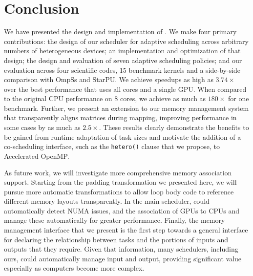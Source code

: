 \section{Conclusion}
\label{sec:conclusion}

We have presented the design and implementation of \tsarlong.  We make four
primary contributions: the design of our scheduler for adaptive scheduling
across arbitrary numbers of heterogeneous devices; an implementation and
optimization of that design; the design and evaluation of seven adaptive
scheduling policies; and our evaluation across four scientific codes, 15
benchmark kernels and a side-by-side comparison with OmpSs and StarPU. We
achieve speedups as high as $3.74 \times$ over the best performance that uses
all cores and a single GPU.  When compared to the original CPU performance on
8 cores, we achieve as much as $180 \times$ for one benchmark. Further, we
present an extension to our memory management system that transparently aligns
matrices during mapping, improving performance in some cases by as much as
$2.5\times$.  These results clearly demonstrate the benefits to be gained from
runtime adaptation of task sizes and motivate the addition of a co-scheduling
interface, such as the \verb#hetero()# clause that we propose, to Accelerated
OpenMP.

As future work, we will investigate more comprehensive memory association
support. Starting from the padding transformation we presented here, we will
pursue more automatic transformations to allow loop body code to reference
different memory layouts transparently. In the main scheduler, \tsar could
automatically detect NUMA issues, and the association of GPUs to CPUs and
manage these automatically for greater performance. Finally, the memory
management interface that we present is the first step towards a general
interface for declaring the relationship between tasks and the portions of
inputs and outputs that they require. Given that information, many schedulers,
including ours, could automatically manage input and output, providing
significant value especially as computers become more complex.


